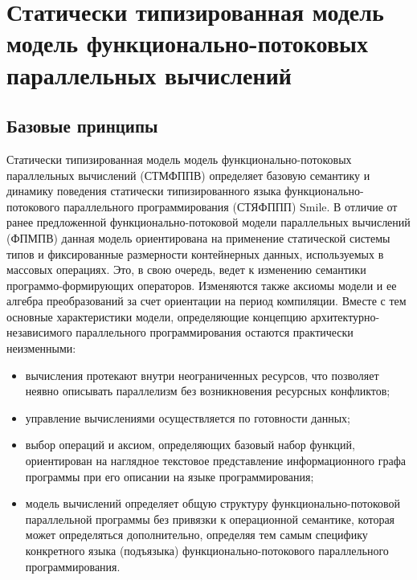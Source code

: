 
\chapter[СТМФППВ]{Статически типизированная модель модель функционально-потоковых параллельных вычислений}

\section{Базовые принципы}
Статически типизированная модель модель функционально-потоковых параллельных вычислений (СТМФППВ) определяет базовую семантику и динамику поведения статически типизированного языка функционально-потокового параллельного программирования (СТЯФППП) Smile. В отличие от ранее предложенной функционально-потоковой модели параллельных вычислений (ФПМПВ) данная модель ориентирована на применение статической системы типов и фиксированные размерности контейнерных данных, используемых в массовых операциях. Это, в свою очередь, ведет к изменению семантики программо-формирующих операторов. Изменяются также аксиомы модели и ее алгебра преобразований за счет ориентации на период компиляции. Вместе с тем основные характеристики модели, определяющие концепцию архитектурно-независимого параллельного программирования остаются практически неизменными:
\begin{itemize}
	\item вычисления протекают внутри неограниченных ресурсов, что позволяет неявно описывать параллелизм без возникновения ресурсных конфликтов;
	\item управление вычислениями осуществляется по готовности данных;
	\item выбор операций и аксиом, определяющих базовый набор функций, ориентирован на наглядное текстовое представление информационного графа программы при его описании на языке программирования;
	\item модель вычислений определяет общую структуру функционально-потоковой параллельной программы без привязки к операционной семантике, которая может определяться дополнительно, определяя тем самым специфику конкретного языка (подъязыка) функционально-потокового параллельного программирования.
\end{itemize}

